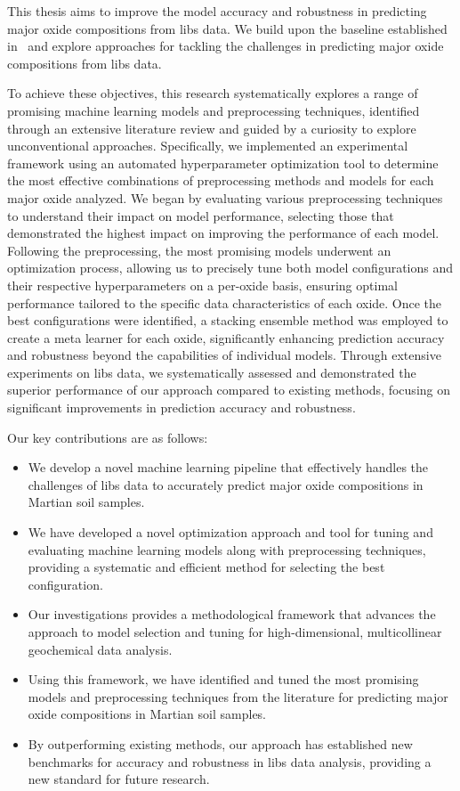 This thesis aims to improve the model accuracy and robustness in predicting major oxide compositions from \gls{libs} data.
We build upon the baseline established in~\citet{p9_paper} and explore approaches for tackling the challenges in predicting major oxide compositions from \gls{libs} data.

To achieve these objectives, this research systematically explores a range of promising machine learning models and preprocessing techniques, identified through an extensive literature review and guided by a curiosity to explore unconventional approaches.
Specifically, we implemented an experimental framework using an automated hyperparameter optimization tool to determine the most effective combinations of preprocessing methods and models for each major oxide analyzed.
We began by evaluating various preprocessing techniques to understand their impact on model performance, selecting those that demonstrated the highest impact on improving the performance of each model.
Following the preprocessing, the most promising models underwent an optimization process, allowing us to precisely tune both model configurations and their respective hyperparameters on a per-oxide basis, ensuring optimal performance tailored to the specific data characteristics of each oxide.
Once the best configurations were identified, a stacking ensemble method was employed to create a meta learner for each oxide, significantly enhancing prediction accuracy and robustness beyond the capabilities of individual models.
Through extensive experiments on \gls{libs} data, we systematically assessed and demonstrated the superior performance of our approach compared to existing methods, focusing on significant improvements in prediction accuracy and robustness.

Our key contributions are as follows:
\begin{itemize}
    \item We develop a novel machine learning pipeline that effectively handles the challenges of \gls{libs} data to accurately predict major oxide compositions in Martian soil samples.
    \item We have developed a novel optimization approach and tool for tuning and evaluating machine learning models along with preprocessing techniques, providing a systematic and efficient method for selecting the best configuration.
    \item Our investigations provides a methodological framework that advances the approach to model selection and tuning for high-dimensional, multicollinear geochemical data analysis.
    \item Using this framework, we have identified and tuned the most promising models and preprocessing techniques from the literature for predicting major oxide compositions in Martian soil samples.
    \item By outperforming existing methods, our approach has established new benchmarks for accuracy and robustness in \gls{libs} data analysis, providing a new standard for future research.
\end{itemize}


